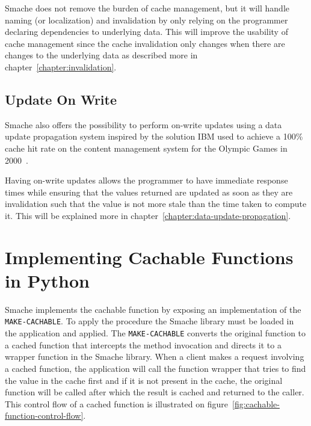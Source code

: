 Smache does not remove the burden of cache management, but it will handle naming (or localization) and invalidation by only relying on the programmer declaring dependencies to underlying data. This will improve the usability of cache management since the cache invalidation only changes when there are changes to the underlying data as described more in chapter~\ref{chapter:invalidation}.


\subsection{Update On Write}
\label{subsec:write-through-updates}

Smache also offers the possibility to perform on-write updates using a data update propagation system inspired by the solution IBM used to achieve a 100\% cache hit rate on the content management system for the Olympic Games in 2000~\cite{paper:ibm, paper:ibm-extended}.

Having on-write updates allows the programmer to have immediate response times while ensuring that the values returned are updated as soon as they are invalidation such that the value is not more stale than the time taken to compute it. This will be explained more in chapter~\ref{chapter:data-update-propagation}.


\section{Implementing Cachable Functions in Python}
\label{sec:implementing_cachable_functions_in_python}

Smache implements the cachable function by exposing an implementation of the \verb$MAKE-CACHABLE$. To apply the procedure the Smache library must be loaded in the application and applied. The \verb$MAKE-CACHABLE$ converts the original function to a cached function that intercepts the method invocation and directs it to a wrapper function in the Smache library. When a client makes a request involving a cached function, the application will call the function wrapper that tries to find the value in the cache first and if it is not present in the cache, the original function will be called after which the result is cached and returned to the caller. This control flow of a cached function is illustrated on figure~\ref{fig:cachable-function-control-flow}.

